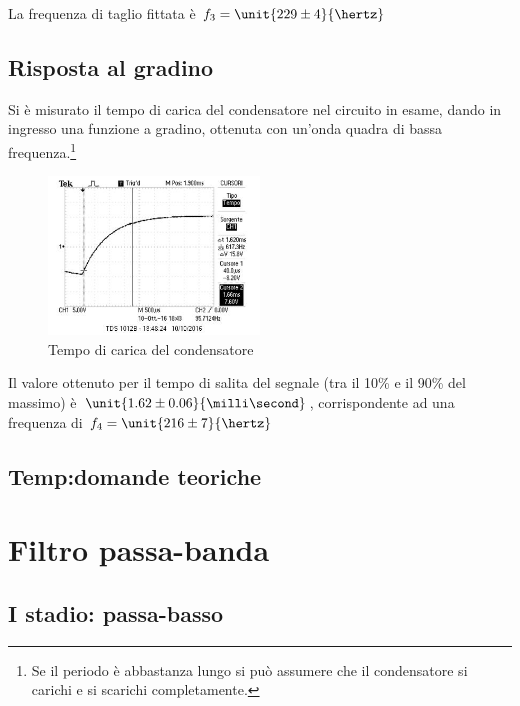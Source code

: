 \documentclass[10pt,a4paper]{article}
\begin{document}
La frequenza di taglio fittata è $f_3 = \unit{229 \pm 4}{\hertz}$

\subsection{Risposta al gradino}
Si è misurato il tempo di carica del condensatore nel circuito in esame, dando in ingresso una funzione a gradino, ottenuta con un'onda quadra di bassa frequenza.\footnote{Se il periodo è abbastanza lungo si può assumere che il condensatore si carichi e si scarichi completamente.}

\begin{figure}[h!]
	\centering
	\includegraphics[width=0.5\textwidth]{../oscilloscopio/raise_time.jpg}
	\caption{Tempo di carica del condensatore}
	\label{fig:raise}
\end{figure}

Il valore ottenuto per il tempo di salita del segnale (tra il 10\% e il 90\% del massimo) è $\unit{1.62 \pm 0.06}{\milli\second}$, corrispondente ad una frequenza di $f_4 = \unit{216 \pm 7}{\hertz}$

\subsection{Temp:domande teoriche}

\section{Filtro passa-banda}

\subsection{I stadio: passa-basso}
\end{document}
